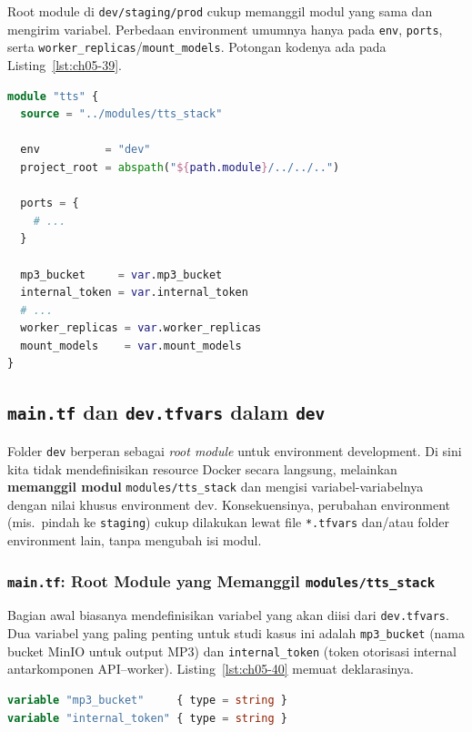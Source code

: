 Root module di \texttt{dev/staging/prod} cukup memanggil modul yang sama dan mengirim variabel. Perbedaan environment umumnya hanya pada \texttt{env}, \texttt{ports}, serta \texttt{worker\_replicas}/\texttt{mount\_models}. Potongan kodenya ada pada Listing~\ref{lst:ch05-39}.

\begin{lstlisting}[language=terraform, caption={Potongan kode Terraform pada Pemanggilan Modul dari Root Module}, label={lst:ch05-39}]
module "tts" {
  source = "../modules/tts_stack"

  env          = "dev"
  project_root = abspath("${path.module}/../../..")

  ports = {
    # ...
  }

  mp3_bucket     = var.mp3_bucket
  internal_token = var.internal_token
  # ...
  worker_replicas = var.worker_replicas
  mount_models    = var.mount_models
}
\end{lstlisting}

\subsection{\texttt{main.tf} dan \texttt{dev.tfvars} dalam \texttt{dev}}

Folder \texttt{dev} berperan sebagai \textit{root module} untuk environment development. Di sini kita tidak mendefinisikan resource Docker secara langsung, melainkan \textbf{memanggil modul} \texttt{modules/tts\_stack} dan mengisi variabel-variabelnya dengan nilai khusus environment dev. Konsekuensinya, perubahan environment (mis.\ pindah ke \texttt{staging}) cukup dilakukan lewat file \texttt{*.tfvars} dan/atau folder environment lain, tanpa mengubah isi modul.

\subsubsection{\texttt{main.tf}: Root Module yang Memanggil \texttt{modules/tts\_stack}}

Bagian awal biasanya mendefinisikan variabel yang akan diisi dari \texttt{dev.tfvars}. Dua variabel yang paling penting untuk studi kasus ini adalah \texttt{mp3\_bucket} (nama bucket MinIO untuk output MP3) dan \texttt{internal\_token} (token otorisasi internal antarkomponen API--worker). Listing~\ref{lst:ch05-40} memuat deklarasinya.

\begin{lstlisting}[language=terraform, caption={Potongan main.tf: variabel yang diisi dari dev.tfvars}, label={lst:ch05-40}]
variable "mp3_bucket"     { type = string }
variable "internal_token" { type = string }
\end{lstlisting}

